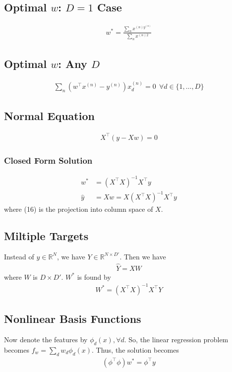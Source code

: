 \documentclass{article}
\begin{document}
\subsection{Optimal $w$: $D = 1$ Case}
\begin{align}
    w^* = \frac{\sum_n x^{(n)y^{(n)}}}{\sum_n x^{(n)2}}
\end{align}
\subsection{Optimal $w$: Any $D$}
\begin{align}
    \sum_n(w^\top x^{(n)} - y^{(n)})x_d^{(n)} = 0\ \ \forall d \in \{1, \ldots, D\}
\end{align}
\subsection{Normal Equation}
\begin{align}
    X^\top(y-Xw) = 0
\end{align}
\subsubsection{Closed Form Solution}
\begin{align}
    w^* &= (X^\top X)^{-1}X^\top y\\
    \hat{y} &= Xw = X(X^\top X)^{-1}X^\top y
\end{align}
where (16) is the projection into column space of $X$.
\subsection{Miltiple Targets}
Instead of $y \in \mathbb{R}^N$, we have $Y \in \mathbb{R}^{N \times D'}$. Then we have
\begin{align}
    \hat{Y} = XW
\end{align}
where $W$ is $D \times D'$. $W^*$ is found by
\begin{align}
    W^* = (X^\top X)^{-1}X^\top Y
\end{align}
\subsection{Nonlinear Basis Functions}
Now denote the features by $\phi_d(x), \forall d$. So, the linear regression problem becomes $f_w = \sum_d w_d \phi_d(x)$. Thus, the solution becomes
\begin{align}
    (\phi^\top\phi)w^* = \phi^\top y
\end{align}
\end{document}
